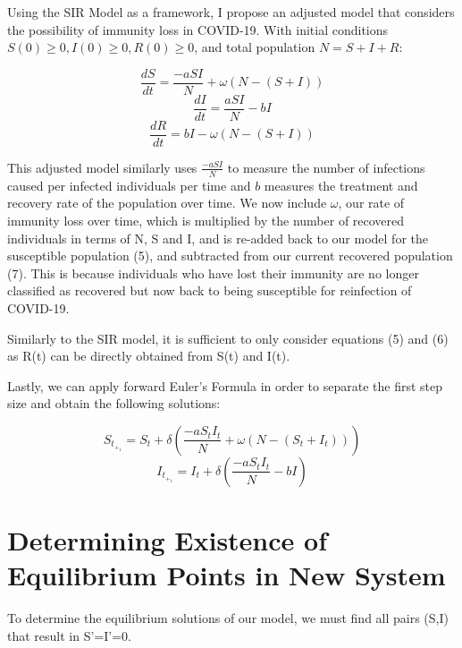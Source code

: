 \documentclass[%
 reprint,
]{revtex4-2}
\begin{document}
Using the SIR Model as a framework, I propose an adjusted model that considers the possibility of immunity loss in COVID-19. With initial conditions $S(0)\geq0, I(0)\geq0, R(0)\geq0$, and total population $N=S+I+R$:

\begin{equation} \frac{dS}{dt} = \frac{-aSI}{N} + \omega(N-(S+I)) \end{equation}
\begin{equation} \frac{dI}{dt} = \frac{aSI}{N} - bI \end{equation}
\begin{equation} \frac{dR}{dt} = bI - \omega(N-(S+I)) \end{equation}

This adjusted model similarly uses $\frac{-aSI}{N}$ to measure the number of infections caused per infected individuals per time and $b$ measures the treatment and recovery rate of the population over time. We now include $\omega$, our rate of immunity loss over time, which is multiplied by the number of recovered individuals in terms of N, S and I, and is re-added back to our model for the susceptible population (5), and subtracted from our current recovered population (7). This is because individuals who have lost their immunity are no longer classified as recovered but now back to being susceptible for reinfection of COVID-19. 

Similarly to the SIR model, it is sufficient to only consider equations (5) and (6) as R(t) can be directly obtained from S(t) and I(t). 

Lastly, we can apply forward Euler’s Formula in order to separate the first step size and obtain the following solutions:

\begin{equation} S_t_+_1 = S_t + \delta(\frac{-aS_tI_t}{N} + \omega(N-(S_t + I_t))) \end{equation}
\begin{equation} I_t_+_1 = I_t + \delta(\frac{-aS_tI_t}{N} - bI) \end{equation}

\section{\label{sec:level1}Determining Existence of Equilibrium Points in New System\protect\\}

To determine the equilibrium solutions of our model, we must find all pairs (S,I) that result in S’=I’=0. 
\end{document}
